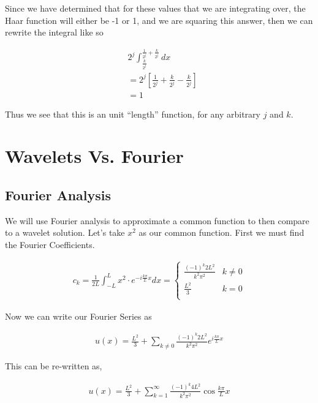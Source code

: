 \documentclass[12pt]{amsart}
\begin{document}
Since we have determined that for these values that we are integrating over, the Haar function will either be -1 or 1, and we are squaring this answer, then we can rewrite the integral like so

\begin{align}
  &2^j\int_{\frac{k}{2^j}}^{\frac{1}{2^j}+\frac{k}{2^j}}dx\\
  &=2^j\left[\frac{1}{2^j}+\frac{k}{2^j} - \frac{k}{2^j}\right]\\
  &= 1
\end{align}

Thus we see that this is an unit ``length'' function, for any arbitrary $j$ and $k$.

\section{Wavelets Vs. Fourier}%
\label{sec:wavelets_vs_fourier}

\subsection{Fourier Analysis}%
\label{sub:fourier_analysis}

We will use Fourier analysis to approximate a common function to then compare to a wavelet solution. Let's take $x^2$ as our common function. First we must find the Fourier Coefficients.

\begin{align}
  c_k = \frac{1}{2L}\int_{-L}^{L}x^2\cdot e^{-i\frac{k\pi}{L}x}dx = \begin{cases} 
    \frac{(-1)^{k}2L^{2}}{k^{2}\pi ^{2}}  & k \neq 0 \\
    \frac{L^{2}}{3} & k=0 \\
  \end{cases}
\end{align}

Now we can write our Fourier Series as 

\begin{align}
   u(x) = \frac{L^{2}}{3} + \sum_{k \neq 0}^{} \frac{(-1)^{k}2L^{2}}{k^{2}\pi ^{2}}e^{i\frac{k\pi}{L}x}
\end{align}

This can be re-written as,

\begin{align}
   u(x) = \frac{L^{2}}{3} + \sum_{k =1}^{\infty} \frac{(-1)^{k}4L^{2}}{k^{2}\pi ^{2}}
   \cos{\frac{k\pi}{L}x}
\end{align}
\end{document}
